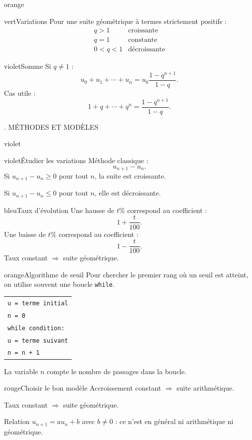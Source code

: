 \documentclass[11pt,a4paper]{article}
\makeatletter
\newcommand{\code}[1]{\texttt{#1}}
\newcommand{\tagcol}[2]{\begin{tcolorbox}[enhanced,colback=#1!11,colframe=#1!45!black,boxrule=0.42pt,arc=2mm,left=1mm,right=1mm,top=0.45mm,bottom=0.45mm,before skip=0mm,after skip=0.85mm,fontupper=\bfseries\scriptsize,colupper=#1!55!black]\centering #2\end{tcolorbox}}
\newcommand{\miniAlgoSeuil}{%
\begin{tcolorbox}[colback=white,colframe=gris!60!black,boxrule=0.35pt,arc=1mm,left=1.2mm,right=1mm,top=0.8mm,bottom=0.8mm,before skip=0.4mm,after skip=0.4mm]
\scriptsize
\begin{tabular}{@{}l@{}}
\code{u = terme initial}\\
\code{n = 0}\\
\code{while condition:}\\
\quad\code{u = terme suivant}\\
\quad\code{n = n + 1}
\end{tabular}
\end{tcolorbox}}
\makeatother
\begin{document}
\begin{landscape}
\begin{minipage}[t]{0.242\linewidth}
\begin{panel}{orange}
\begin{fichebox}{vert}{Variations}
Pour une suite géométrique à termes strictement positifs :
\[
\begin{array}{c|c}
q>1 & \text{croissante}\\
q=1 & \text{constante}\\
0<q<1 & \text{décroissante}
\end{array}
\]
\end{fichebox}

\begin{fichebox}{violet}{Somme}
Si $q\neq1$ :
\[
 u_0+u_1+\cdots+u_n
 =u_0\frac{1-q^{n+1}}{1-q}.
\]
Cas utile :
\[
1+q+\cdots+q^n=\frac{1-q^{n+1}}{1-q}.
\]
\end{fichebox}

\end{panel}
\end{minipage}\hfill
\begin{minipage}[t]{0.242\linewidth}
\tagcol{violet}{4. MÉTHODES ET MODÈLES}
\begin{panel}{violet}

\begin{fichebox}{violet}{Étudier les variations}
Méthode classique :
\[
 u_{n+1}-u_n.
\]
Si $u_{n+1}-u_n\geq0$ pour tout $n$, la suite est croissante.

Si $u_{n+1}-u_n\leq0$ pour tout $n$, elle est décroissante.
\end{fichebox}

\begin{fichebox}{bleu}{Taux d'évolution}
Une hausse de $t\%$ correspond au coefficient :
\[
1+\frac{t}{100}.
\]
Une baisse de $t\%$ correspond au coefficient :
\[
1-\frac{t}{100}.
\]
Taux constant $\Rightarrow$ suite géométrique.
\end{fichebox}

\begin{fichebox}{orange}{Algorithme de seuil}
Pour chercher le premier rang où un seuil est atteint, on utilise souvent une boucle \code{while}.
\miniAlgoSeuil
La variable $n$ compte le nombre de passages dans la boucle.
\end{fichebox}

\begin{fichebox}{rouge}{Choisir le bon modèle}
Accroissement constant $\Rightarrow$ suite arithmétique.

Taux constant $\Rightarrow$ suite géométrique.

Relation $u_{n+1}=a u_n+b$ avec $b\neq0$ : ce n'est en général ni arithmétique ni géométrique.
\end{fichebox}

\end{panel}
\end{minipage}

\end{landscape}
\nopagecolor
\restoregeometry
\pagestyle{fancy}
\clearpage
\end{document}
